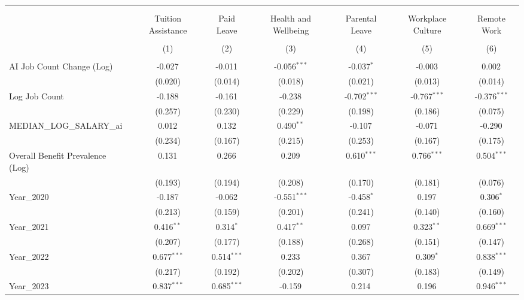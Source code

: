 \begin{table}[!htbp] \centering
\begin{tabular}{@{\extracolsep{5pt}}lcccccc}
\\[-1.8ex]\hline
\hline \\[-1.8ex]
\\[-1.8ex] & \multicolumn{1}{c}{Tuition Assistance} & \multicolumn{1}{c}{Paid Leave} & \multicolumn{1}{c}{Health and Wellbeing} & \multicolumn{1}{c}{Parental Leave} & \multicolumn{1}{c}{Workplace Culture} & \multicolumn{1}{c}{Remote Work}  \\
\\[-1.8ex] & (1) & (2) & (3) & (4) & (5) & (6) \\
\hline \\[-1.8ex]
 AI Job Count Change (Log) & -0.027$^{}$ & -0.011$^{}$ & -0.056$^{***}$ & -0.037$^{*}$ & -0.003$^{}$ & 0.002$^{}$ \\
& (0.020) & (0.014) & (0.018) & (0.021) & (0.013) & (0.014) \\
 Log Job Count & -0.188$^{}$ & -0.161$^{}$ & -0.238$^{}$ & -0.702$^{***}$ & -0.767$^{***}$ & -0.376$^{***}$ \\
& (0.257) & (0.230) & (0.229) & (0.198) & (0.186) & (0.075) \\
 MEDIAN_LOG_SALARY_ai & 0.012$^{}$ & 0.132$^{}$ & 0.490$^{**}$ & -0.107$^{}$ & -0.071$^{}$ & -0.290$^{}$ \\
& (0.234) & (0.167) & (0.215) & (0.253) & (0.167) & (0.175) \\
 Overall Benefit Prevalence (Log) & 0.131$^{}$ & 0.266$^{}$ & 0.209$^{}$ & 0.610$^{***}$ & 0.766$^{***}$ & 0.504$^{***}$ \\
& (0.193) & (0.194) & (0.208) & (0.170) & (0.181) & (0.076) \\
 Year_2020 & -0.187$^{}$ & -0.062$^{}$ & -0.551$^{***}$ & -0.458$^{*}$ & 0.197$^{}$ & 0.306$^{*}$ \\
& (0.213) & (0.159) & (0.201) & (0.241) & (0.140) & (0.160) \\
 Year_2021 & 0.416$^{**}$ & 0.314$^{*}$ & 0.417$^{**}$ & 0.097$^{}$ & 0.323$^{**}$ & 0.669$^{***}$ \\
& (0.207) & (0.177) & (0.188) & (0.268) & (0.151) & (0.147) \\
 Year_2022 & 0.677$^{***}$ & 0.514$^{***}$ & 0.233$^{}$ & 0.367$^{}$ & 0.309$^{*}$ & 0.838$^{***}$ \\
& (0.217) & (0.192) & (0.202) & (0.307) & (0.183) & (0.149) \\
 Year_2023 & 0.837$^{***}$ & 0.685$^{***}$ & -0.159$^{}$ & 0.214$^{}$ & 0.196$^{}$ & 0.946$^{***}$ \\

\end{tabular}
\end{table}
